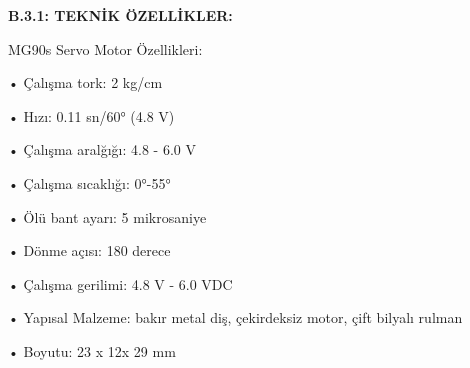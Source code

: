 \textbf{B.3.1: TEKNİK ÖZELLİKLER:}
\label{CH:AltBolum4.1}

MG90s Servo Motor Özellikleri:

•	Çalışma tork: 2 kg/cm

•	Hızı: 0.11 sn/60° (4.8 V)

•	Çalışma aralğığı: 4.8 - 6.0 V

•	Çalışma sıcaklığı: 0°-55°

•	Ölü bant ayarı: 5 mikrosaniye

•	Dönme açısı: 180 derece

•	Çalışma gerilimi: 4.8 V - 6.0 VDC

•	Yapısal Malzeme: bakır metal diş, çekirdeksiz motor, çift bilyalı rulman

•	Boyutu: 23 x 12x 29 mm


\clearpage
